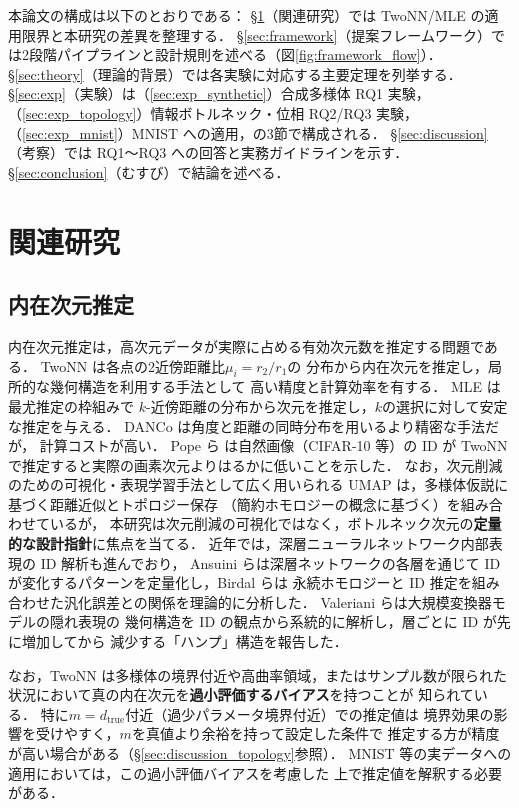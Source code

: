 \documentclass[12pt,a4paper]{jsarticle}
\newcommand{\dtrue}{d_{\mathrm{true}}}
\begin{document}
本論文の構成は以下のとおりである：
§\ref{sec:related}（関連研究）では TwoNN/MLE の適用限界と本研究の差異を整理する．
§\ref{sec:framework}（提案フレームワーク）では2段階パイプラインと設計規則を述べる（図\ref{fig:framework_flow}）．
§\ref{sec:theory}（理論的背景）では各実験に対応する主要定理を列挙する．
§\ref{sec:exp}（実験）は（\ref{sec:exp_synthetic}）合成多様体 RQ1 実験，
（\ref{sec:exp_topology}）情報ボトルネック・位相 RQ2/RQ3 実験，
（\ref{sec:exp_mnist}）MNIST への適用，の3節で構成される．
§\ref{sec:discussion}（考察）では RQ1〜RQ3 への回答と実務ガイドラインを示す．
§\ref{sec:conclusion}（むすび）で結論を述べる．

\section{関連研究}\label{sec:related}

\subsection{内在次元推定}

内在次元推定は，高次元データが実際に占める有効次元数を推定する問題である．
TwoNN\cite{facco2017twonn} は各点の2近傍距離比$\mu_i = r_2/r_1$の
分布から内在次元を推定し，局所的な幾何構造を利用する手法として
高い精度と計算効率を有する．
MLE\cite{levina2005mle} は最尤推定の枠組みで
$k$-近傍距離の分布から次元を推定し，$k$の選択に対して安定な推定を与える．
DANCo\cite{ceruti2014danco} は角度と距離の同時分布を用いるより精密な手法だが，
計算コストが高い．
Pope ら\cite{pope2021intrinsic} は自然画像（CIFAR-10 等）の ID が
TwoNN で推定すると実際の画素次元よりはるかに低いことを示した．
なお，次元削減のための可視化・表現学習手法として広く用いられる
UMAP\cite{mcinnes2018umap} は，多様体仮説に基づく距離近似とトポロジー保存
（簡約ホモロジー\cite{chazal2021introduction}の概念に基づく）を組み合わせているが，
本研究は次元削減の可視化ではなく，ボトルネック次元の\textbf{定量的な設計指針}に焦点を当てる．
近年では，深層ニューラルネットワーク内部表現の ID 解析も進んでおり，
Ansuini ら\cite{ansuini2019intrinsic}は深層ネットワークの各層を通じて
ID が変化するパターンを定量化し，Birdal ら\cite{birdal2021intrinsic}は
永続ホモロジーと ID 推定を組み合わせた汎化誤差との関係を理論的に分析した．
Valeriani ら\cite{valeriani2023geometry}は大規模変換器モデルの隠れ表現の
幾何構造を ID の観点から系統的に解析し，層ごとに ID が先に増加してから
減少する「ハンプ」構造を報告した．

なお，TwoNN は多様体の境界付近や高曲率領域，またはサンプル数が限られた
状況において真の内在次元を\textbf{過小評価するバイアス}を持つことが
知られている\cite{facco2017twonn}．
特に$m = \dtrue$付近（過少パラメータ境界付近）での推定値は
境界効果の影響を受けやすく，$m$を真値より余裕を持って設定した条件で
推定する方が精度が高い場合がある（§\ref{sec:discussion_topology}参照）．
MNIST 等の実データへの適用においては，この過小評価バイアスを考慮した
上で推定値を解釈する必要がある．
\end{document}
